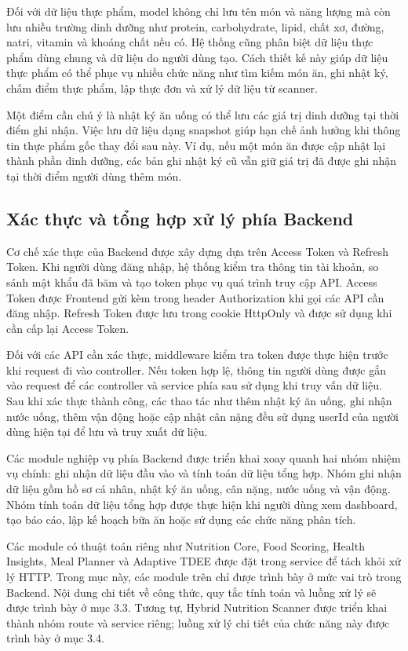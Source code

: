 \documentclass[12pt, a4paper]{report}
\begin{document}
Đối với dữ liệu thực phẩm, model không chỉ lưu tên món và năng lượng mà còn lưu nhiều trường dinh dưỡng như protein, carbohydrate, lipid, chất xơ, đường, natri, vitamin và khoáng chất nếu có. Hệ thống cũng phân biệt dữ liệu thực phẩm dùng chung và dữ liệu do người dùng tạo. Cách thiết kế này giúp dữ liệu thực phẩm có thể phục vụ nhiều chức năng như tìm kiếm món ăn, ghi nhật ký, chấm điểm thực phẩm, lập thực đơn và xử lý dữ liệu từ scanner.

Một điểm cần chú ý là nhật ký ăn uống có thể lưu các giá trị dinh dưỡng tại thời điểm ghi nhận. Việc lưu dữ liệu dạng snapshot giúp hạn chế ảnh hưởng khi thông tin thực phẩm gốc thay đổi sau này. Ví dụ, nếu một món ăn được cập nhật lại thành phần dinh dưỡng, các bản ghi nhật ký cũ vẫn giữ giá trị đã được ghi nhận tại thời điểm người dùng thêm món.

\subsection{Xác thực và tổng hợp xử lý phía Backend}Cơ chế xác thực của Backend được xây dựng dựa trên Access Token và Refresh Token. Khi người dùng đăng nhập, hệ thống kiểm tra thông tin tài khoản, so sánh mật khẩu đã băm và tạo token phục vụ quá trình truy cập API. Access Token được Frontend gửi kèm trong header Authorization khi gọi các API cần đăng nhập. Refresh Token được lưu trong cookie HttpOnly và được sử dụng khi cần cấp lại Access Token.

Đối với các API cần xác thực, middleware kiểm tra token được thực hiện trước khi request đi vào controller. Nếu token hợp lệ, thông tin người dùng được gắn vào request để các controller và service phía sau sử dụng khi truy vấn dữ liệu. Sau khi xác thực thành công, các thao tác như thêm nhật ký ăn uống, ghi nhận nước uống, thêm vận động hoặc cập nhật cân nặng đều sử dụng userId của người dùng hiện tại để lưu và truy xuất dữ liệu.

Các module nghiệp vụ phía Backend được triển khai xoay quanh hai nhóm nhiệm vụ chính: ghi nhận dữ liệu đầu vào và tính toán dữ liệu tổng hợp. Nhóm ghi nhận dữ liệu gồm hồ sơ cá nhân, nhật ký ăn uống, cân nặng, nước uống và vận động. Nhóm tính toán dữ liệu tổng hợp được thực hiện khi người dùng xem dashboard, tạo báo cáo, lập kế hoạch bữa ăn hoặc sử dụng các chức năng phân tích.

Các module có thuật toán riêng như Nutrition Core, Food Scoring, Health Insights, Meal Planner và Adaptive TDEE được đặt trong service để tách khỏi xử lý HTTP. Trong mục này, các module trên chỉ được trình bày ở mức vai trò trong Backend. Nội dung chi tiết về công thức, quy tắc tính toán và luồng xử lý sẽ được trình bày ở mục 3.3. Tương tự, Hybrid Nutrition Scanner được triển khai thành nhóm route và service riêng; luồng xử lý chi tiết của chức năng này được trình bày ở mục 3.4.
\end{document}
